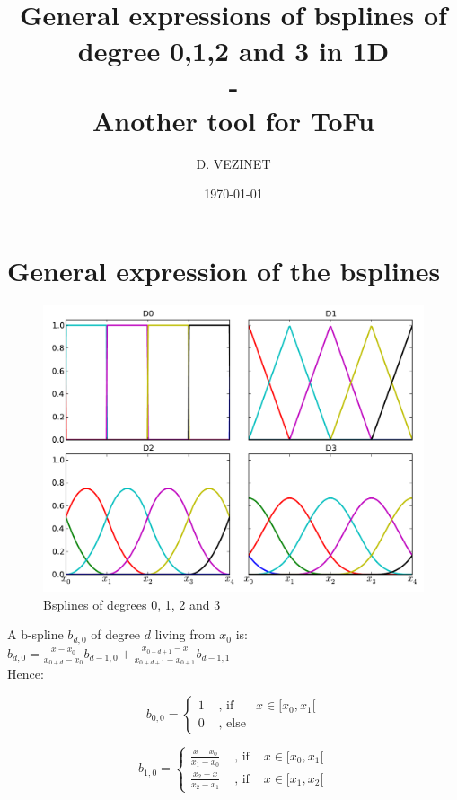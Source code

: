 \documentclass[paper=a4, fontsize=11pt]{scrartcl}
\title{
		\usefont{OT1}{bch}{b}{n}
		\horrule{0.5pt} \\[0.2cm]
		\LARGE General expressions of bsplines of degree 0,1,2 and 3 in 1D\\
        -\\
        \normalsize Another tool for ToFu
		\horrule{2pt} \\[0.3cm]
}
\author{D. VEZINET}
\date{\today}
\numberwithin{equation}{section}		%
\numberwithin{figure}{section}			%
\numberwithin{table}{section}				%
\begin{document}
\maketitle

\tableofcontents

\newpage
\section{General expression of the bsplines}


\begin{figure}[hbtp]
    \centering
    \includegraphics[scale=0.50]{BSplines_GeneralExpression_Deriv0.pdf}
    \caption{\small Bsplines of degrees 0, 1, 2 and 3}
    \label{Fig:Grid}
\end{figure}

A b-spline $b_{d,0}$ of degree $d$ living from $x_0$ is:$ b_{d,0} = \frac{x-x_0}{x_{0+d}-x_0}b_{d-1,0} + \frac{x_{0+d+1}-x}{x_{0+d+1}-x_{0+1}}b_{d-1,1} $\\
Hence:

$$
b_{0,0} =
\left\{
\begin{array}{lll}
1 & \text{ ,  if  } & x \in [x_0,x_1[\\
0 & \text{ ,  else}
\end{array}
\right.
$$

$$
b_{1,0} =
\left\{
\begin{array}{lll}
\frac{x-x_0}{x_1-x_0} & \text{ ,  if  } & x \in [x_0,x_1[\\
\frac{x_2-x}{x_2-x_1} & \text{ ,  if  } & x \in [x_1,x_2[
\end{array}
\right.
$$
\end{document}
